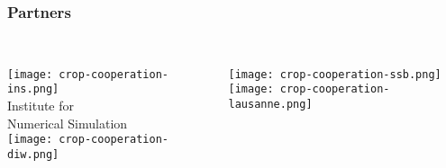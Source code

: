 \begin{frame}\frametitle{Partners}\vspace{1.0cm}

\begin{columns}[t]

\centering \\  \vspace{-1.25cm}
	\texttt{[image: crop-cooperation-ins.png]} \\\vspace{-0.5cm}
		\footnotesize{Institute for \\ Numerical Simulation}\vspace{0.3cm}   \\ \vspace{0.5cm}
	\texttt{[image: crop-cooperation-diw.png]} \\ \vspace{0.5cm}

	\centering \\ \vspace{-0.5cm}
	\texttt{[image: crop-cooperation-ssb.png]} \\ \vspace{0.85cm}
 	\texttt{[image: crop-cooperation-lausanne.png]} \\

\centering \\

\end{columns}

\end{frame}


